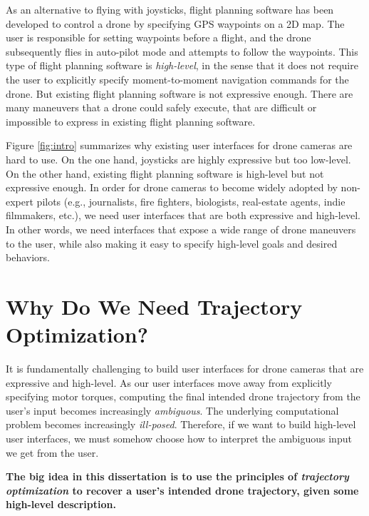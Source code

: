 As an alternative to flying with joysticks, flight planning software has been developed to control a drone by specifying GPS waypoints on a 2D map. 
The user is responsible for setting waypoints before a flight, and the drone subsequently flies in auto-pilot mode and attempts to follow the waypoints.
This type of flight planning software is \emph{high-level}, in the sense that it does not require the user to explicitly specify moment-to-moment navigation commands for the drone.
But existing flight planning software is not expressive enough.
There are many maneuvers that a drone could safely execute, that are difficult or impossible to express in existing flight planning software.

Figure \ref{fig:intro} summarizes why existing user interfaces for drone cameras are hard to use.
On the one hand, joysticks are highly expressive but too low-level.
On the other hand, existing flight planning software is high-level but not expressive enough.
In order for drone cameras to become widely adopted by non-expert pilots (e.g., journalists, fire fighters, biologists, real-estate agents, indie filmmakers, etc.), we need user interfaces that are both expressive and high-level.
In other words, we need interfaces that expose a wide range of drone maneuvers to the user, while also making it easy to specify high-level goals and desired behaviors.

\section{Why Do We Need Trajectory Optimization?}

It is fundamentally challenging to build user interfaces for drone cameras that are expressive and high-level.
As our user interfaces move away from explicitly specifying motor torques, computing the final intended drone trajectory from the user's input becomes increasingly \emph{ambiguous}.
The underlying computational problem becomes increasingly \emph{ill-posed}.
Therefore, if we want to build high-level user interfaces, we must somehow choose how to interpret the ambiguous input we get from the user.

\begin{tcolorbox}[before skip=20pt, after skip=20pt, sharp corners]
\begin{center}
\textbf{The big idea in this dissertation is to use the principles of \emph{trajectory optimization} to recover a user's intended drone trajectory, given some high-level description.}
\end{center}
\end{tcolorbox}

